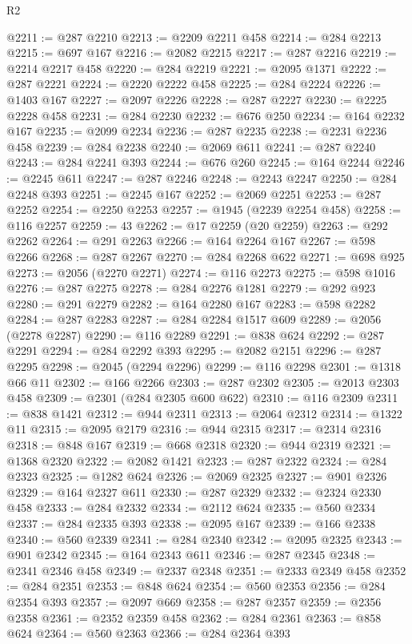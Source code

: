 \begin{lexlean}{R2}
\begin{coremodule}
@2211 := @287 @2210
@2213 := @2209 @2211 @458
@2214 := @284 @2213
@2215 := @697 @167
@2216 := @2082 @2215
@2217 := @287 @2216
@2219 := @2214 @2217 @458
@2220 := @284 @2219
@2221 := @2095 @1371
@2222 := @287 @2221
@2224 := @2220 @2222 @458
@2225 := @284 @2224
@2226 := @1403 @167
@2227 := @2097 @2226
@2228 := @287 @2227
@2230 := @2225 @2228 @458
@2231 := @284 @2230
@2232 := @676 @250
@2234 := @164 @2232 @167
@2235 := @2099 @2234
@2236 := @287 @2235
@2238 := @2231 @2236 @458
@2239 := @284 @2238
@2240 := @2069 @611
@2241 := @287 @2240
@2243 := @284 @2241 @393
@2244 := @676 @260
@2245 := @164 @2244
@2246 := @2245 @611
@2247 := @287 @2246
@2248 := @2243 @2247
@2250 := @284 @2248 @393
@2251 := @2245 @167
@2252 := @2069 @2251
@2253 := @287 @2252
@2254 := @2250 @2253
@2257 := @1945 (@2239 @2254 @458)
@2258 := @116 @2257
@2259 := 43
@2262 := @17 @2259 (@20 @2259)
@2263 := @292 @2262
@2264 := @291 @2263
@2266 := @164 @2264 @167
@2267 := @598 @2266
@2268 := @287 @2267
@2270 := @284 @2268 @622
@2271 := @698 @925
@2273 := @2056 (@2270 @2271)
@2274 := @116 @2273
@2275 := @598 @1016
@2276 := @287 @2275
@2278 := @284 @2276 @1281
@2279 := @292 @923
@2280 := @291 @2279
@2282 := @164 @2280 @167
@2283 := @598 @2282
@2284 := @287 @2283
@2287 := @284 @2284 @1517 @609
@2289 := @2056 (@2278 @2287)
@2290 := @116 @2289
@2291 := @838 @624
@2292 := @287 @2291
@2294 := @284 @2292 @393
@2295 := @2082 @2151
@2296 := @287 @2295
@2298 := @2045 (@2294 @2296)
@2299 := @116 @2298
@2301 := @1318 @66 @11
@2302 := @166 @2266
@2303 := @287 @2302
@2305 := @2013 @2303 @458
@2309 := @2301 (@284 @2305 @600 @622)
@2310 := @116 @2309
@2311 := @838 @1421
@2312 := @944 @2311
@2313 := @2064 @2312
@2314 := @1322 @11
@2315 := @2095 @2179
@2316 := @944 @2315
@2317 := @2314 @2316
@2318 := @848 @167
@2319 := @668 @2318
@2320 := @944 @2319
@2321 := @1368 @2320
@2322 := @2082 @1421
@2323 := @287 @2322
@2324 := @284 @2323
@2325 := @1282 @624
@2326 := @2069 @2325
@2327 := @901 @2326
@2329 := @164 @2327 @611
@2330 := @287 @2329
@2332 := @2324 @2330 @458
@2333 := @284 @2332
@2334 := @2112 @624
@2335 := @560 @2334
@2337 := @284 @2335 @393
@2338 := @2095 @167
@2339 := @166 @2338
@2340 := @560 @2339
@2341 := @284 @2340
@2342 := @2095 @2325
@2343 := @901 @2342
@2345 := @164 @2343 @611
@2346 := @287 @2345
@2348 := @2341 @2346 @458
@2349 := @2337 @2348
@2351 := @2333 @2349 @458
@2352 := @284 @2351
@2353 := @848 @624
@2354 := @560 @2353
@2356 := @284 @2354 @393
@2357 := @2097 @669
@2358 := @287 @2357
@2359 := @2356 @2358
@2361 := @2352 @2359 @458
@2362 := @284 @2361
@2363 := @858 @624
@2364 := @560 @2363
@2366 := @284 @2364 @393

\end{coremodule}
\end{lexlean}
